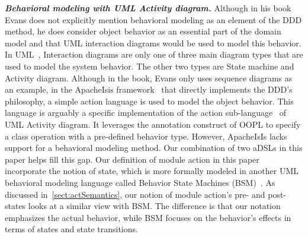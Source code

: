 \textbf{\textit{Behavioral modeling with UML Activity diagram.}}
Although in his book~\cite{evans_domain-driven_2004} Evans does not explicitly mention behavioral modeling as an element of the DDD method, he does consider object behavior as an essential part of the domain model and that UML interaction diagrams would be used to model this behavior. 
%
%
%  
%
In UML~\cite[p.~285]{omg_unified_2017}, Interaction diagrams are only one of three main diagram types that are used to model the system behavior. The other two types are State machine and Activity diagram. Although in the book, Evans only uses sequence diagrams as an example, in the ApacheIsis framework~\cite{dan_haywood_apache_2013} that directly implements the DDD's philosophy, a simple action language is used to model the object behavior. This language is arguably a specific implementation of the action sub-language~\cite[p.~441]{omg_unified_2017} of UML Activity diagram. It leverages the annotation construct of OOPL to specify a class operation with a pre-defined behavior type. However, ApacheIsIs lacks support for a behavioral modeling method. Our combination of two aDSLs in this paper helps fill this gap.
%
Our definition of module action in this paper incorporate the notion of state, which is more formally modeled in another UML behavioral modeling language called Behavior State Machines (BSM)~\cite[p.~305]{omg_unified_2017}. 
As discussed in~\ref{sect:actSemantics}, our notion of module action's pre- and post-states looks at a similar view with BSM. The difference is that our notation emphasizes the actual behavior, while BSM focuses on the behavior's effects in terms of states and state transitions.

